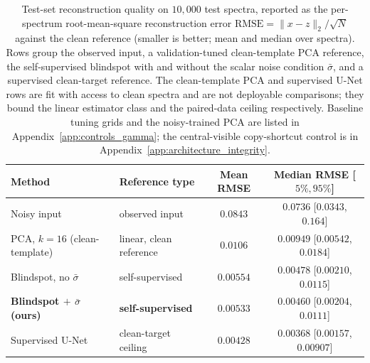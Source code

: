 \documentclass[twocolumn]{aastex7}
\begin{document}
\begin{table}
\centering
\caption{Test-set reconstruction quality on $10{,}000$ test spectra, reported as the per-spectrum root-mean-square reconstruction error $\mathrm{RMSE}=\lVert x-z\rVert_{2}/\sqrt{N}$ against the clean reference (smaller is better; mean and median over spectra). Rows group the observed input, a validation-tuned clean-template PCA reference, the self-supervised blindspot with and without the scalar noise condition $\bar{\sigma}$, and a supervised clean-target reference. The clean-template PCA and supervised U-Net rows are fit with access to clean spectra and are not deployable comparisons; they bound the linear estimator class and the paired-data ceiling respectively. Baseline tuning grids and the noisy-trained PCA are listed in Appendix~\ref{app:controls_gamma}; the central-visible copy-shortcut control is in Appendix~\ref{app:architecture_integrity}.}
\label{tab:main_baselines}
\begin{tabular}{llcc}
\hline
Method & Reference type & Mean RMSE & Median RMSE [$5\%, 95\%$] \\
\hline
Noisy input & observed input & $0.0843$ & $0.0736$ [$0.0343$, $0.164$] \\
PCA, $k\!=\!16$ (clean-template) & linear, clean reference & $0.0106$ & $0.00949$ [$0.00542$, $0.0184$] \\
Blindspot, no $\bar{\sigma}$ & self-supervised & $0.00554$ & $0.00478$ [$0.00210$, $0.0115$] \\
\textbf{Blindspot $+$ $\bar{\sigma}$ (ours)} & \textbf{self-supervised} & $\mathbf{0.00533}$ & $\mathbf{0.00460}$ [$\mathbf{0.00204}$, $\mathbf{0.0111}$] \\
Supervised U-Net & clean-target ceiling & $0.00428$ & $0.00368$ [$0.00157$, $0.00907$] \\
\hline
\end{tabular}
\end{table}
\end{document}
